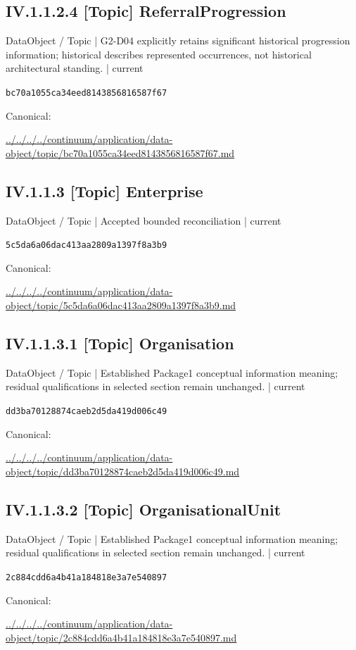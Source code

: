 \documentclass[10pt,a4paper]{article}
\begin{document}
\subsection*{IV.1.1.2.4 [Topic] ReferralProgression}
{\small DataObject / Topic | G2-D04 explicitly retains significant historical progression information; historical describes represented occurrences, not historical architectural standing. | current}\par
\texttt{bc70a1055ca34eed8143856816587f67}\par
Canonical: \par
{\footnotesize\url{../../../../continuum/application/data-object/topic/bc70a1055ca34eed8143856816587f67.md}}\par
\subsection*{IV.1.1.3 [Topic] Enterprise}
{\small DataObject / Topic | Accepted bounded reconciliation | current}\par
\texttt{5c5da6a06dac413aa2809a1397f8a3b9}\par
Canonical: \par
{\footnotesize\url{../../../../continuum/application/data-object/topic/5c5da6a06dac413aa2809a1397f8a3b9.md}}\par
\subsection*{IV.1.1.3.1 [Topic] Organisation}
{\small DataObject / Topic | Established Package1 conceptual information meaning; residual qualifications in selected section remain unchanged. | current}\par
\texttt{dd3ba70128874caeb2d5da419d006c49}\par
Canonical: \par
{\footnotesize\url{../../../../continuum/application/data-object/topic/dd3ba70128874caeb2d5da419d006c49.md}}\par
\subsection*{IV.1.1.3.2 [Topic] OrganisationalUnit}
{\small DataObject / Topic | Established Package1 conceptual information meaning; residual qualifications in selected section remain unchanged. | current}\par
\texttt{2c884cdd6a4b41a184818e3a7e540897}\par
Canonical: \par
{\footnotesize\url{../../../../continuum/application/data-object/topic/2c884cdd6a4b41a184818e3a7e540897.md}}\par
\end{document}
